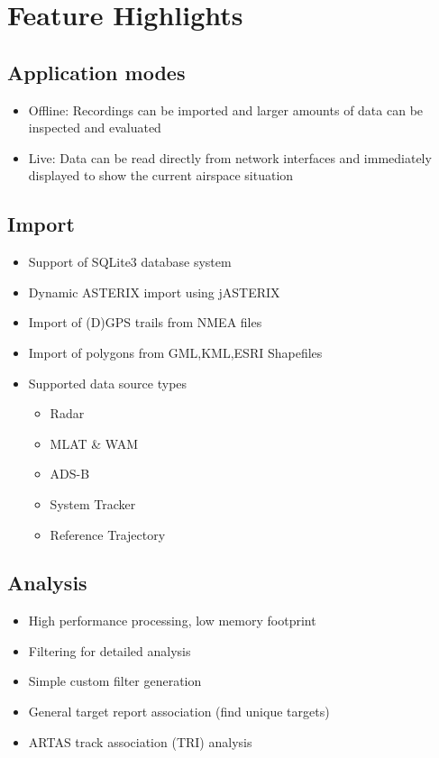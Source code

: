\section{Feature Highlights}

\subsection{Application modes}
\begin{itemize} 
    \item Offline: Recordings can be imported and larger amounts of data can be inspected and evaluated
    \item Live: Data can be read directly from network interfaces and immediately displayed to show the current airspace situation
\end{itemize}

\subsection{Import}
\begin{itemize}  
    \item Support of SQLite3 database system
    \item Dynamic ASTERIX import using jASTERIX
    \item Import of (D)GPS trails from NMEA files
    \item Import of polygons from GML,KML,ESRI Shapefiles
    \item Supported data source types
    \begin{itemize}  
        \item Radar
        \item MLAT \& WAM
        \item ADS-B
        \item System Tracker
        \item Reference Trajectory
    \end{itemize}
\end{itemize}

\subsection{Analysis}
\begin{itemize}  
    \item High performance processing, low memory footprint
    \item Filtering for detailed analysis
    \item Simple custom filter generation
    \item General target report association (find unique targets)
    \item ARTAS track association (TRI) analysis
\end{itemize}

